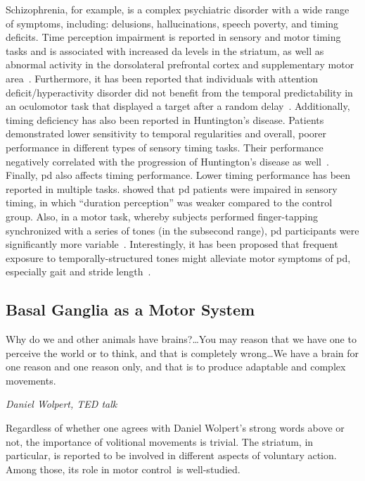 Schizophrenia, for example, is a complex psychiatric disorder with a wide range of symptoms, including: delusions, hallucinations, speech poverty, and timing deficits.
Time perception impairment is reported in sensory and motor timing tasks and is associated with increased \gls{da} levels in the striatum, as well as abnormal activity in the dorsolateral prefrontal cortex and supplementary motor area~\cite[see][]{Snowden2019}.
Furthermore, it has been reported that individuals with attention deficit/hyperactivity disorder did not benefit from the temporal predictability in an oculomotor task that displayed a target after a random delay~\cite{Dankner2017}.
Additionally, timing deficiency has also been reported in Huntington’s disease.
Patients demonstrated lower sensitivity to temporal regularities and overall, poorer performance in different types of sensory timing tasks.
Their performance negatively correlated with the progression of Huntington’s disease as well~\cite{Cope2014}.
Finally, \gls{pd} also affects timing performance.
Lower timing performance has been reported in multiple tasks.
 showed that \gls{pd} patients were impaired in sensory timing, in which ``duration perception'' was weaker compared to the control group.
Also, in a motor task, whereby subjects performed finger-tapping synchronized with a series of tones (in the subsecond range), \gls{pd} participants were significantly more variable~\cite{Harrington1998}.
Interestingly, it has been proposed that frequent exposure to temporally-structured tones might alleviate motor symptoms of \gls{pd}, especially gait and stride length~\cite{Dalla2017}.


\subsection{Basal Ganglia as a Motor System}
\label{intro:BGMotor}
{\singlespacing \epigraph{Why do we and other animals have brains?\dots You may reason that we have one to perceive the world or to think, and that is completely wrong\dots We have a brain for one reason and one reason only, and that is to produce adaptable and complex movements.}
{\textit{Daniel Wolpert, TED talk}}}
\noindent
Regardless of whether one agrees with Daniel Wolpert's strong words above or not, the importance of volitional movements is trivial.
The striatum, in particular, is reported to be involved in different aspects of voluntary action.
Among those, its role in motor control\footnotemark\ is well-studied.


